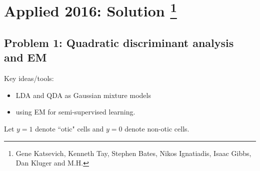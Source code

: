 \section{Applied 2016: Solution \footnote{Gene Katsevich, Kenneth Tay, Stephen Bates, Nikos Ignatiadis, Isaac Gibbs, Dan Kluger and M.H.}}

\subsection*{Problem 1: Quadratic discriminant analysis and EM}
Key ideas/tools:
\begin{itemize}
\item LDA and QDA as Gaussian mixture models
\item using EM for semi-supervised learning.
\end{itemize}


Let $y = 1$ denote ``otic" cells and $y = 0$ denote non-otic cells.

